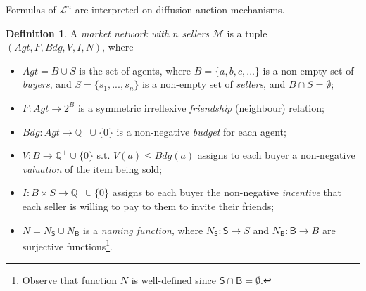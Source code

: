 \documentclass[letterpaper]{article} %
\theoremstyle{definition}
\newtheorem{definition}{Definition}
\begin{document}
Formulas of $\mathcal{L}^n$ are interpreted on diffusion auction mechanisms.


\begin{definition}
A \emph{market network with $n$ sellers} $\mathcal{M}$ is a tuple $(Agt, F, Bdg, V, I, N)$, where 
\begin{itemize}
    \item $Agt = B \cup S$ is the set of agents, where $B = \{a,b,c,...\}$ is a non-empty set of \emph{buyers}, and $S = \{s_1, ..., s_n\}$ is a non-empty set of \emph{sellers}, and $B \cap S = \emptyset$;
    \item $F:Agt \to 2^{B}$ is a symmetric irreflexive \emph{friendship} (neighbour) relation;
    \item $Bdg:Agt \to \mathbb{Q}^+ \cup \{0\} $ is a non-negative \emph{budget} for each agent;
    \item $V:B \to \mathbb{Q}^+ \cup \{0\}$ s.t. $V(a) \leqslant Bdg(a)$ assigns to each buyer a non-negative \emph{valuation} of the item being sold;
    \item $I:B\times S \to \mathbb{Q}^+ \cup \{0\}$ assigns to each buyer the non-negative \emph{incentive} that each seller is willing to pay to them to invite their friends; %
    \item $N  = N_{\mathsf{S}} \cup N_{\mathsf{B}}$ is a \emph{naming function}, where $N_{\mathsf{S}} : \mathsf{S} \to S$ and $N_{\mathsf{B}} : \mathsf{B} \to B$ are surjective functions\footnote{Observe that function $N$ is well-defined since $\mathsf{S} \cap \mathsf{B} = \emptyset$.}.
\end{itemize} 


\end{definition}
\end{document}
